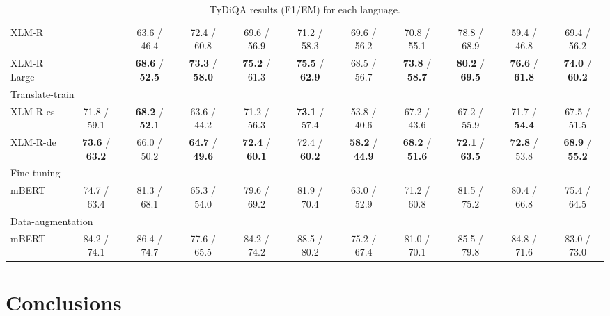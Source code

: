\documentclass[11pt]{article}
\begin{document}
\begin{table*}[!ht]
\begin{adjustbox}{max width=\textwidth}
\begin{tabular}{l|ccccccccc|c}
        XLM-R & ~ & 63.6 / 46.4 & 72.4 / 60.8 & 69.6 / 56.9 & 71.2 / 58.3 & 69.6 / 56.2 & 70.8 / 55.1 & 78.8 / 68.9 & 59.4 / 46.8 & 69.4 / 56.2 \\
        XLM-R Large & ~ & \textbf{68.6} / \textbf{52.5} & \textbf{73.3} / \textbf{58.0} & \textbf{75.2} / 61.3 & \textbf{75.5} / \textbf{62.9} & 68.5 / 56.7 & \textbf{73.8} / \textbf{58.7} & \textbf{80.2} / \textbf{69.5} & \textbf{76.6} / \textbf{61.8} & \textbf{74.0} / \textbf{60.2}\\
        \midrule
        \multicolumn{11}{l}{Translate-train} \\
        \midrule
        XLM-R-es & 71.8 / 59.1 & \textbf{68.2} / \textbf{52.1} & 63.6 / 44.2 & 71.2 / 56.3 & \textbf{73.1} / 57.4 & 53.8 / 40.6 & 67.2 / 43.6 & 67.2 / 55.9 & 71.7 / \textbf{54.4} & 67.5 / 51.5 \\
        XLM-R-de & \textbf{73.6} / \textbf{63.2} & 66.0 / 50.2 & \textbf{64.7} / \textbf{49.6} & \textbf{72.4} / \textbf{60.1} & 72.4 / \textbf{60.2} & \textbf{58.2} / \textbf{44.9} & \textbf{68.2} / \textbf{51.6} & \textbf{72.1} / \textbf{63.5} & \textbf{72.8} / 53.8 & \textbf{68.9} / \textbf{55.2} \\
        \midrule
        \multicolumn{11}{l}{Fine-tuning} \\
        \midrule
        mBERT & 74.7 / 63.4 & 81.3 / 68.1 & 65.3 / 54.0 & 79.6 / 69.2 & 81.9 / 70.4 & 63.0 / 52.9 & 71.2 / 60.8 & 81.5 / 75.2 & 80.4 / 66.8 & 75.4 / 64.5  \\
        \midrule
        \multicolumn{11}{l}{Data-augmentation} \\
        \midrule
        mBERT & 84.2 / 74.1 & 86.4 / 74.7 & 77.6 / 65.5 & 84.2 / 74.2 & 88.5 / 80.2 & 75.2 / 67.4 & 81.0 / 70.1 & 85.5 / 79.8 & 84.8 / 71.6 & 83.0 / 73.0 \\
        \bottomrule
    \end{tabular}
    \end{adjustbox}
    \centering
    \caption{TyDiQA results (F1/EM) for each language.}
    \label{TyDiQA_results}
\end{table*}


\section{Conclusions}



\end{document}
